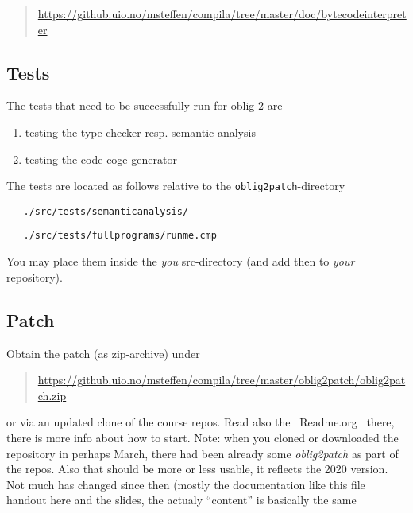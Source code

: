 \documentclass[11pt,freeform]{handout}[2014/08/13]
\begin{document}
\begin{quote}
  \url{https://github.uio.no/msteffen/compila/tree/master/doc/bytecodeinterpreter}
\end{quote}





\subsection*{Tests}
\label{sec:tests}

The tests that need to be successfully run for oblig 2 are
\begin{enumerate}
\item testing the type checker resp. semantic analysis
\item testing the code coge generator
\end{enumerate}


The tests are located as follows relative to the
\texttt{oblig2patch}-directory

\begin{verbatim}
   ./src/tests/semanticanalysis/
\end{verbatim}


\begin{verbatim}
   ./src/tests/fullprograms/runme.cmp
\end{verbatim}


You may place them inside the \emph{you} src-directory (and add then to
\emph{your} repository).

\subsection*{Patch}
\label{sec:patch}


Obtain the patch (as zip-archive) under 

\begin{quote}
  \url{https://github.uio.no/msteffen/compila/tree/master/oblig2patch/oblig2patch.zip}
\end{quote}

or via an updated clone of the course repos. Read also the ~Readme.org~
there, there is more info about how to start. Note: when you cloned or
downloaded the repository in perhaps March, there had been already some
\emph{oblig2patch} as part of the repos. Also that should be more or less
usable, it reflects the 2020 version. Not much has changed since then
(mostly the documentation like this file handout here and the slides, the
actualy ``content'' is basically the same




%
% 




\end{document}
